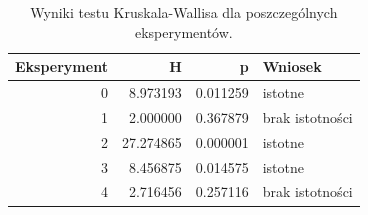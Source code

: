 \begin{table}
\caption{Wyniki testu Kruskala-Wallisa dla poszczególnych eksperymentów.}
\label{tab:kruskal_exp}
\begin{tabular}{rrrl}
\toprule
Eksperyment & H & p & Wniosek \\
\midrule
0 & 8.973193 & 0.011259 & istotne \\
1 & 2.000000 & 0.367879 & brak istotności \\
2 & 27.274865 & 0.000001 & istotne \\
3 & 8.456875 & 0.014575 & istotne \\
4 & 2.716456 & 0.257116 & brak istotności \\
\bottomrule
\end{tabular}
\end{table}
